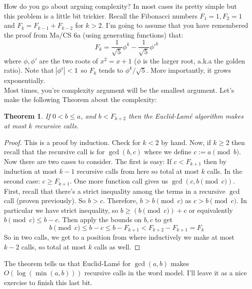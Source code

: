\documentclass[11pt]{article}
\theoremstyle{plain}
\newtheorem{thm}{Theorem}[section] %
\theoremstyle{definition}
\numberwithin{equation}{section}
\numberwithin{figure}{section}
\begin{document}
\noindent How do you go about arguing complexity? In most cases its pretty simple but this problem is a little bit trickier. Recall the Fibonacci numbers $F_1 = 1, F_2 = 1$ and $F_k = F_{k-1} + F_{k-2}$ for $k > 2$. I'm going to assume that you have remembered the proof from Ma/CS 6a (using generating functions) that:
\begin{equation}
F_k = \frac{1}{\sqrt{5}} \phi^k - \frac{1}{\sqrt{5}} {\phi'}^k
\label{eq:4-fib}
\end{equation}
where $\phi, \phi'$ are the two roots of $x^2 = x + 1$ ($\phi$ is the larger root, a.k.a the golden ratio). Note that $\abs{\phi'} < 1$ so $F_k$ tends to $\phi^k / \sqrt{5}$. More importantly, it grows exponentially. \\

\noindent Most times, you're complexity argument will be the smallest argument. Let's make the following Theorem about the complexity:

\begin{thm}
If $0 < b \leq a$, and $b < F_{k+2}$ then the Euclid-Lam\'e algorithm makes at most $k$ recursive calls.
\end{thm}

\begin{proof}
This is a proof by induction. Check for $k < 2$ by hand. Now, if $k \geq 2$ then recall that the recursive call is for $\gcd(b, c)$ where we define $c := a \pmod  b$. Now there are two cases to consider. The first is easy: If $c < F_{k + 1}$ then by induction at most $k-1$ recursive calls from here so total at most $k$ calls. \checkmark In the second case: $c \geq F_{k+1}$. One more function call gives us $\gcd(c, b \pmod c)$. First, recall that there's a strict inequality among the terms in a recursive $\gcd$ call (proven previously). So $b > c$. Therefore, $b > b \pmod c$ as $c > b \pmod c$. In particular we have strict inequality, so $b \geq (b \pmod c) + c$ or equivalently $b \pmod c \leq b - c$. Then apply the bounds on $b,c$ to get
\begin{equation}
b \pmod c \leq b - c \leq b - F_{k + 1} < F_{k+2} - F_{k+1} = F_k
\end{equation}
So in two calls, we get to a position from where inductively we make at most $k-2$ calls, so total at most $k$ calls as well. 
\end{proof}

\noindent The theorem tells us that Euclid-Lam\'e for $\gcd(a, b)$ makes $O(\log(\min(a,b)))$ recursive calls in the word model. I'll leave it as a nice exercise to finish this last bit. \\
\end{document}
